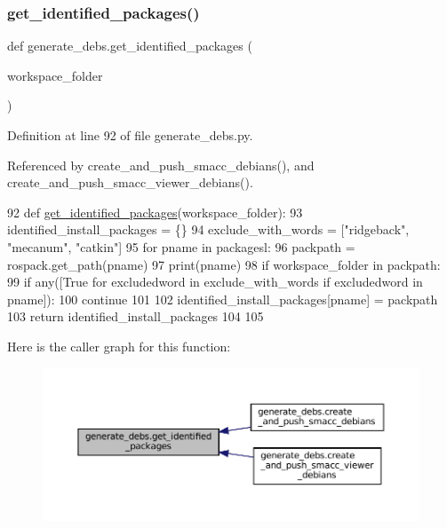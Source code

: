 \subsubsection{\texorpdfstring{get\+\_\+identified\+\_\+packages()}{get\_identified\_packages()}}
{\footnotesize\ttfamily def generate\+\_\+debs.\+get\+\_\+identified\+\_\+packages (\begin{DoxyParamCaption}\item[{}]{workspace\+\_\+folder }\end{DoxyParamCaption})}



Definition at line 92 of file generate\+\_\+debs.\+py.



Referenced by create\+\_\+and\+\_\+push\+\_\+smacc\+\_\+debians(), and create\+\_\+and\+\_\+push\+\_\+smacc\+\_\+viewer\+\_\+debians().


\begin{DoxyCode}
92 \textcolor{keyword}{def }\hyperlink{namespacegenerate__debs_aa91b87c6d9c3ed04015845cc9298431a}{get\_identified\_packages}(workspace\_folder):
93     identified\_install\_packages = \{\}
94     exclude\_with\_words = [\textcolor{stringliteral}{"ridgeback"}, \textcolor{stringliteral}{"mecanum"}, \textcolor{stringliteral}{"catkin"}]
95     \textcolor{keywordflow}{for} pname \textcolor{keywordflow}{in} packagesl:
96         packpath = rospack.get\_path(pname)
97         print(pname)
98         \textcolor{keywordflow}{if} workspace\_folder \textcolor{keywordflow}{in} packpath:
99             \textcolor{keywordflow}{if} any([\textcolor{keyword}{True} \textcolor{keywordflow}{for} excludedword \textcolor{keywordflow}{in} exclude\_with\_words \textcolor{keywordflow}{if} excludedword \textcolor{keywordflow}{in} pname]):
100                 \textcolor{keywordflow}{continue}
101 
102             identified\_install\_packages[pname] = packpath
103     \textcolor{keywordflow}{return} identified\_install\_packages
104 
105 
\end{DoxyCode}
Here is the caller graph for this function\+:
\nopagebreak
\begin{figure}[H]
\begin{center}
\leavevmode
\includegraphics[width=350pt]{namespacegenerate__debs_aa91b87c6d9c3ed04015845cc9298431a_icgraph}
\end{center}
\end{figure}
\mbox{\label{namespacegenerate__debs_a2615a6fc7860b6aa9e920e6b4d886589}} 
